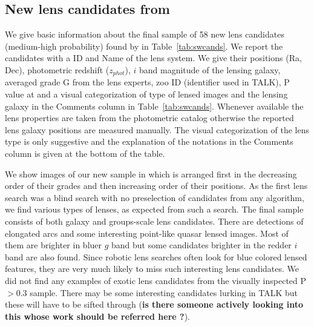 \documentclass[useAMS,usenatbib,a4paper]{mn2e}
\begin{document}

\subsection{New lens candidates from \sw}
\label{sec:results:newcand}

We give basic information about the final sample of 58 new lens
candidates (medium-high probability) found by \sw in
Table~\ref{tab:swcands}. We report the candidates with a \sw ID and Name of the
lens system. We give their positions (Ra, Dec), photometric redshift
($z_{phot}$), $i$ band magnitude of the lensing galaxy, averaged grade G from
the lens experts, zoo ID (identifier used in TALK), P
value at \StageTwo and a visual categorization of type of lensed images and the
lensing galaxy in the Comments column in Table~\ref{tab:swcands}. Whenever
available the lens properties are taken from the \cfhtls photometric catalog
\citep{Coupon2009} otherwise the reported lens galaxy positions are measured
manually. The visual categorization of the lens type is only suggestive and the
explanation of the notations in the Comments column is given at the bottom of
the table.

We show images of our new sample in  which is arranged
first in the decreasing order of their grades and then increasing order
of their positions. As the first lens search was a blind search with no
preselection of candidates from any algorithm, we find various types of
lenses, as expected from such a search. The final sample consists of
both galaxy and groups-scale lens candidates. There are detections of
elongated arcs and some interesting point-like quasar lensed images.
Most of them are brighter in bluer $g$ band but some candidates brighter
in the redder $i$ band are also found. Since robotic lens searches often
look for blue colored lensed features, they are very much likely to miss
such interesting lens candidates.  We did not find any examples of
exotic lens candidates from the visually inspected P$>0.3$ sample. There
may be some interesting candidates lurking in TALK but these will have
to be sifted through ({\bf is there someone actively looking into this
whose work should be referred here ?}). 
\end{document}
